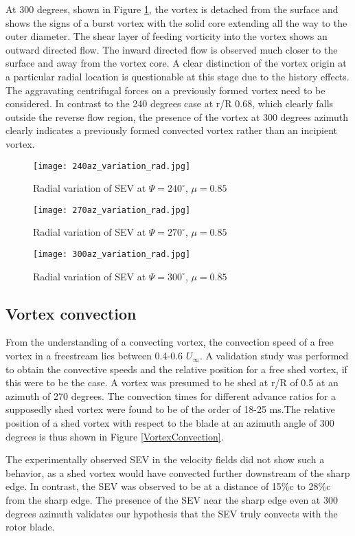 \documentclass[%
 reprint,
 showkeys,
 amsmath,amssymb,
 aps,
]{revtex4-1}
\begin{document}
At 300 degrees, shown in Figure \ref{300az_variation_rad}, the vortex is detached from the surface and shows the signs of a burst vortex with the solid core extending all the way to the outer diameter. The shear layer of feeding vorticity into the vortex shows an outward directed flow. The inward directed flow is observed much closer to the surface and away from the vortex core. A clear distinction of the vortex origin at a particular radial location is questionable at this stage due to the history effects. The aggravating centrifugal forces on a previously formed vortex need to be considered. In contrast to the 240 degrees case at r/R 0.68, which clearly falls outside the reverse flow region, the presence of the vortex at 300 degrees azimuth clearly indicates a previously formed convected vortex rather than an incipient vortex. 

\begin{figure}[!t]
\center
\texttt{[image: 240az\_variation\_rad.jpg]}
\caption{Radial variation of SEV at $\Psi=240^{\circ}$, $\mu=0.85$}
\label{240az_variation_rad}

\texttt{[image: 270az\_variation\_rad.jpg]}
\caption{Radial variation of SEV at $\Psi=270^{\circ}$, $\mu=0.85$}
\label{270az_variation_rad}

\texttt{[image: 300az\_variation\_rad.jpg]}
\caption{Radial variation of SEV at  $\Psi=300^{\circ}$, $\mu=0.85$}
\label{300az_variation_rad}
\end{figure}



\subsection{Vortex convection}

From the understanding of a convecting vortex, the convection speed of a free vortex in a freestream lies between 0.4-0.6 $U_{\infty}$. A validation study was performed to obtain the convective speeds and the relative position for a free shed vortex, if this were to be the case. A vortex was presumed to be shed at r/R of 0.5 at an azimuth of 270 degrees. The convection times for different advance ratios for a supposedly shed vortex were found to be of the order of 18-25 ms.The relative position of a shed vortex with respect to the blade at an azimuth angle of 300 degrees is thus shown in Figure \ref{VortexConvection}.

The experimentally observed SEV in the velocity fields did not show such a behavior, as a shed vortex would have convected further downstream of the sharp edge. In contrast, the SEV was observed to be at a distance of 15\%c to 28\%c from the sharp edge. The presence of the SEV near the sharp edge even at 300 degrees azimuth validates our hypothesis that the SEV truly convects with the rotor blade. 
\end{document}
